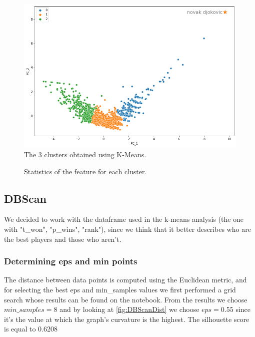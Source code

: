 \begin{figure}[H]
    \centering
    \includegraphics[width=0.5\linewidth]{images/clustering/KMeans/KMeans_out.png}
    \caption{The 3 clusters obtained using K-Means.}
    \label{fig:KMeansOut}
\end{figure}

\begin{figure}[H]
    \centering
    \caption{Statistics of the feature for each cluster.}
    \label{fig:kmeansAvg}
\end{figure}

\subsection{DBScan}
We decided to work with the dataframe used in the k-means analysis (the one with "t\_won", "p\_wins", "rank"), since we think that it better describes who are the best players and those who aren't.

\subsubsection{Determining eps and min points}
The distance between data points is computed using the Euclidean metric, and for selecting the best eps and min\_samples values we first performed a grid search whose results can be found on the notebook. From the results we choose $min\_samples=8$ and by looking at \autoref{fig:DBScanDist} we choose $eps=0.55$ since it's the value at which the graph's curvature is the highest. The silhouette score is equal to 0.6208

